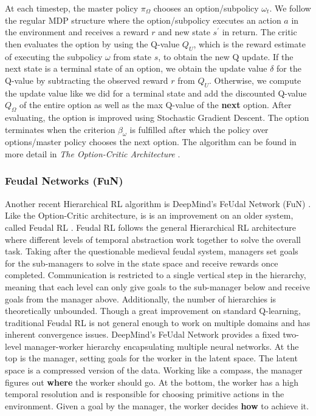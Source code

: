 \documentclass[notitlepage,a4paper,11pt]{article}
\begin{document}
At each timestep, the master policy $\pi_\Omega$ chooses an option/subpolicy $\omega_t$. We follow the regular MDP structure where the option/subpolicy executes an action $a$ in the environment and receives a reward $r$ and new state $s^\prime$ in return. The critic then evaluates the option by using the Q-value $Q_U$, which is the reward estimate of executing the subpolicy $\omega$ from state $s$, to obtain the new Q update. If the next state is a terminal state of an option, we obtain the update value $\delta$ for the Q-value by subtracting the observed reward $r$ from $Q_U$. Otherwise, we compute the update value like we did for a terminal state and add the discounted Q-value $Q_\Omega$ of the entire option as well as the max Q-value of the \textbf{next} option. After evaluating, the option is improved using Stochastic Gradient Descent. The option terminates when the criterion $\beta_\omega$ is fulfilled after which the policy over options/master policy chooses the next option. The algorithm can be found in more detail in \textit{The Option-Critic Architecture} \cite{bacon2017option}.

\subsubsection{Feudal Networks (FuN)}
Another recent Hierarchical RL algorithm is DeepMind's FeUdal Network (FuN) \cite{vezhnevets2017feudal}. Like the Option-Critic architecture, is is an improvement on an older system, called Feudal RL \cite{dayan1993feudal}. Feudal RL follows the general Hierarchical RL architecture where different levels of temporal abstraction work together to solve the overall task. Taking after the questionable medieval feudal system, managers set goals for the sub-managers to solve in the state space and receive rewards once completed. Communication is restricted to a single vertical step in the hierarchy, meaning that each level can only give goals to the sub-manager below and receive goals from the manager above. Additionally, the number of hierarchies is theoretically unbounded. Though a great improvement on standard Q-learning, traditional Feudal RL is not general enough to work on multiple domains and has inherent convergence issues. DeepMind's FeUdal Network provides a fixed two-level manager-worker hierarchy encapsulating multiple neural networks. At the top is the manager, setting goals for the worker in the latent space. The latent space is a compressed version of the data. Working like a compass, the manager figures out \textbf{where} the worker should go. At the bottom, the worker has a high temporal resolution and is responsible for choosing primitive actions in the environment. Given a goal by the manager, the worker decides \textbf{how} to achieve it.
\end{document}
